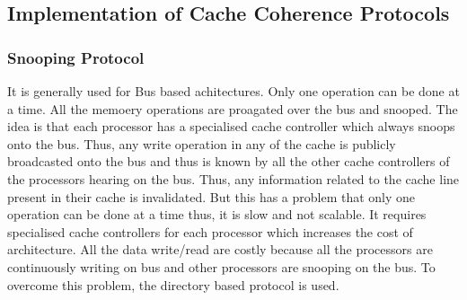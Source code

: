 \documentclass[12pt]{article}
\begin{document}
\subsection{Implementation of Cache Coherence Protocols}
\subsubsection{Snooping Protocol}
It is generally used for Bus based achitectures. Only one operation 
can be done at a time. All the memoery operations are proagated over the bus and snooped.
The idea is that each processor has a specialised cache controller which always snoops onto the bus.
Thus, any write operation in any of the cache is publicly broadcasted onto the bus and thus is known by all the other cache controllers 
of the processors hearing on the bus. Thus, any information related to the cache line present in their cache is invalidated.
But this has a problem that only one operation can be done at a time thus, it is slow and not scalable. It requires specialised cache 
controllers for each processor which increases the cost of architecture. All the data write/read are costly because all the processors are 
continuously writing on bus and other processors are snooping on the bus.
To overcome this problem, the directory based protocol is used.
\end{document}
